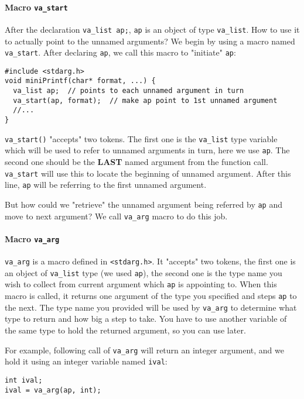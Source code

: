 \documentclass[12pt]{article}
\begin{document}
\paragraph{Macro \texttt{va\_start}}
\label{sec:org3275e02}
After the declaration \texttt{va\_list ap;}, \texttt{ap} is an object of type \texttt{va\_list}. How to use it to actually point to the unnamed arguments? We begin by using a macro named \texttt{va\_start}. After declaring \texttt{ap}, we call this macro to "initiate" \texttt{ap}:
\begin{verbatim}
#include <stdarg.h>
void miniPrintf(char* format, ...) {
  va_list ap;  // points to each unnamed argument in turn
  va_start(ap, format);  // make ap point to 1st unnamed argument
  //...
}
\end{verbatim}
\texttt{va\_start()} "accepts" two tokens. The first one is the \texttt{va\_list} type variable which will be used to refer to unnamed arguments in turn, here we use \texttt{ap}. The second one should be the \textbf{LAST} named argument from the function call. \texttt{va\_start} will use this to locate the beginning of unnamed argument. After this line, \texttt{ap} will be referring to the first unnamed argument.

But how could we "retrieve" the unnamed argument being referred by \texttt{ap} and move to next argument? We call \texttt{va\_arg} macro to do this job.

\paragraph{Macro \texttt{va\_arg}}
\label{sec:orgfe8deeb}
\texttt{va\_arg} is a macro defined in \texttt{<stdarg.h>}. It "accepts" two tokens, the first one is an object of \texttt{va\_list} type (we used \texttt{ap}), the second one is the type name you wish to collect from current argument which \texttt{ap} is appointing to. When this macro is called, it returns one argument of the type you specified and steps \texttt{ap} to the next. The type name you provided will be used by \texttt{va\_arg} to determine what type to return and how big a step to take. You have to use another variable of the same type to hold the returned argument, so you can use later.

For example, following call of \texttt{va\_arg} will return an integer argument, and we hold it using an integer variable named \texttt{ival}:
\begin{verbatim}
int ival;
ival = va_arg(ap, int);
\end{verbatim}
\end{document}
